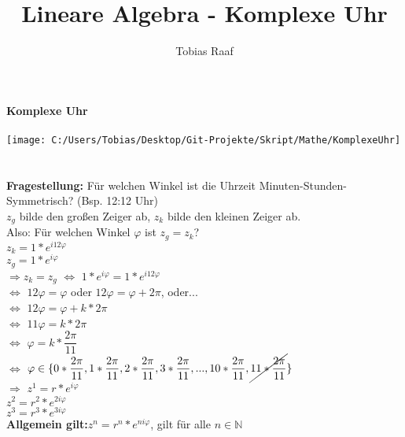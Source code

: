 \documentclass{scrartcl}
\title{Lineare Algebra - Komplexe Uhr}
\author{Tobias Raaf}
\begin{document}
\Large \textbf{Komplexe Uhr}\\\\
\normalsize
\texttt{[image: C:/Users/Tobias/Desktop/Git-Projekte/Skript/Mathe/KomplexeUhr]}
\\\\\\
\textbf{Fragestellung:} Für welchen Winkel ist die Uhrzeit Minuten-Stunden-Symmetrisch? (Bsp. 12:12 Uhr)\\
$z_g$ bilde den großen Zeiger ab, $z_k$ bilde den kleinen Zeiger ab.\\
Also: Für welchen Winkel $\varphi$ ist $z_g=z_k$?\\
$z_k=1*e^{i12\varphi}$\\
$z_g=1*e^{i\varphi}$\\
$\Rightarrow$$z_k=z_g$ $\Leftrightarrow$ $1*e^{i\varphi}=1*e^{i12\varphi}$\\
$\Leftrightarrow$ $12\varphi=\varphi$ oder $12\varphi=\varphi+2\pi$, oder...\\
$\Leftrightarrow$ $12\varphi=\varphi +k*2\pi$\\
$\Leftrightarrow$ $11\varphi=k*2\pi$\\
$\Leftrightarrow$ $\varphi=k*\dfrac{2\pi}{11}$\\
$\Leftrightarrow$ $\varphi\in\{0*\dfrac{2\pi}{11}, 1*\dfrac{2\pi}{11}, 2*\dfrac{2\pi}{11}, 3*\dfrac{2\pi}{11},...,10*\dfrac{2\pi}{11},\cancel{11*\dfrac{2\pi}{11}}\}$\\
$\Rightarrow$ $z^1=r*e^{i\varphi}$\\
$z^2=r^2*e^{2i\varphi}$\\
$z^3=r^3*e^{3i\varphi}$\\
\textbf{Allgemein gilt:}$z^n=r^n*e^{ni\varphi}$, gilt für alle $n\in\mathbb{N}$\\
\end{document}
